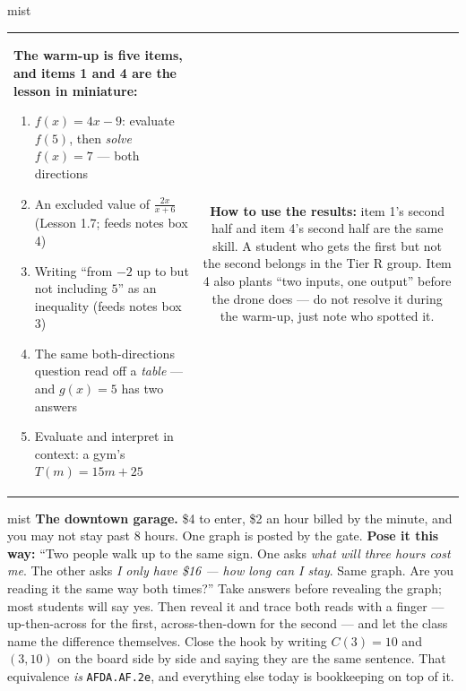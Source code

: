\documentclass[10pt]{article}
\begin{document}
\begin{fixedskillbox}{mist}
\begin{tabularx}{\linewidth}{@{}X c@{}}
\begin{minipage}[t]{0.55\linewidth}\vspace{0pt}
\textbf{The warm-up is five items, and items 1 and 4 are the lesson in miniature:}
\begin{enumerate}[leftmargin=1.4em, itemsep=1pt, topsep=2pt]
  \item $f(x)=4x-9$: evaluate $f(5)$, then \emph{solve} $f(x)=7$ --- both directions
  \item An excluded value of $\frac{2x}{x+6}$ (Lesson 1.7; feeds notes box 4)
  \item Writing ``from $-2$ up to but not including $5$'' as an inequality (feeds notes box 3)
  \item The same both-directions question read off a \emph{table} --- and $g(x)=5$ has two answers
  \item Evaluate and interpret in context: a gym's $T(m)=15m+25$
\end{enumerate}
\end{minipage}
&
\begin{minipage}[t]{0.38\linewidth}\vspace{0pt}
\textbf{How to use the results:} item 1's second half and item 4's second half are the same skill.
A student who gets the first but not the second belongs in the Tier R group. Item 4 also plants
``two inputs, one output'' before the drone does --- do not resolve it during the warm-up, just
note who spotted it.
\end{minipage}
\end{tabularx}
\end{fixedskillbox}

\begin{skillbox}[Hook]{mist}
\textbf{The downtown garage.} \$4 to enter, \$2 an hour billed by the minute, and you may not stay
past 8 hours. One graph is posted by the gate.
\textbf{Pose it this way:} ``Two people walk up to the same sign. One asks \emph{what will three
hours cost me}. The other asks \emph{I only have \$16 --- how long can I stay}. Same graph. Are
you reading it the same way both times?'' Take answers before revealing the graph; most students
will say yes. Then reveal it and trace both reads with a finger --- up-then-across for the first,
across-then-down for the second --- and let the class name the difference themselves. Close the
hook by writing $C(3)=10$ and $(3,10)$ on the board side by side and saying they are the same
sentence. That equivalence \emph{is} \texttt{AFDA.AF.2e}, and everything else today is bookkeeping
on top of it.
\end{skillbox}
\end{document}
